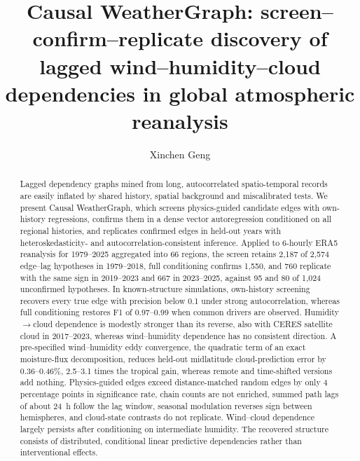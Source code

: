 \documentclass[preprint,12pt]{elsarticle}
\begin{document}
\begin{frontmatter}

\title{Causal WeatherGraph: screen--confirm--replicate discovery of lagged wind--humidity--cloud dependencies in global atmospheric reanalysis}

\author[usc]{Xinchen Geng}

\begin{abstract}
Lagged dependency graphs mined from long, autocorrelated spatio-temporal records are easily inflated by shared history, spatial background and miscalibrated tests. We present Causal WeatherGraph, which screens physics-guided candidate edges with own-history regressions, confirms them in a dense vector autoregression conditioned on all regional histories, and replicates confirmed edges in held-out years with heteroskedasticity- and autocorrelation-consistent inference. Applied to 6-hourly ERA5 reanalysis for 1979--2025 aggregated into 66 regions, the screen retains 2,187 of 2,574 edge--lag hypotheses in 1979--2018, full conditioning confirms 1,550, and 760 replicate with the same sign in 2019--2023 and 667 in 2023--2025, against 95 and 80 of 1,024 unconfirmed hypotheses. In known-structure simulations, own-history screening recovers every true edge with precision below 0.1 under strong autocorrelation, whereas full conditioning restores F1 of 0.97--0.99 when common drivers are observed. Humidity$\rightarrow$cloud dependence is modestly stronger than its reverse, also with CERES satellite cloud in 2017--2023, whereas wind--humidity dependence has no consistent direction. A pre-specified wind--humidity eddy convergence, the quadratic term of an exact moisture-flux decomposition, reduces held-out midlatitude cloud-prediction error by 0.36--0.46\%, 2.5--3.1 times the tropical gain, whereas remote and time-shifted versions add nothing. Physics-guided edges exceed distance-matched random edges by only 4 percentage points in significance rate, chain counts are not enriched, summed path lags of about 24~h follow the lag window, seasonal modulation reverses sign between hemispheres, and cloud-state contrasts do not replicate. Wind--cloud dependence largely persists after conditioning on intermediate humidity. The recovered structure consists of distributed, conditional linear predictive dependencies rather than interventional effects.
\end{abstract}


\end{frontmatter}
\end{document}

